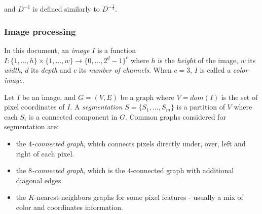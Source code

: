 and $D^{-1}$ is defined similarly to $D^{-\frac{1}{2}}$.

\subsubsection{Image processing}
In this document, an \emph{image} $I$ is a function $I : \{1, ..., h\} \times \{1, ..., w\} \rightarrow \{0, ..., 2^d - 1\}^c$ where $h$ is the \emph{height} of the image, $w$ its \emph{width}, $d$ its \emph{depth} and $c$ its \emph{number of channels}. When $c = 3$, $I$ is called a \emph{color image}.

Let $I$ be an image, and $G = (V,E)$ be a graph where $V = dom(I)$ is the set of pixel coordinates of $I$. A \emph{segmentation} $S = \{S_1, ..., S_m\}$ is a partition of $V$ where each $S_i$ is a connected component in $G$. Common graphs considered for segmentation are:

\begin{itemize}
\item the \emph{$4$-connected graph}, which connects pixels directly under, over, left and right of each pixel.
\item the \emph{$8$-connected graph}, which is the $4$-connected graph with additional diagonal edges.
\item the $K$-nearest-neighbors graphs for some pixel features - usually a mix of color and coordinates information.
\end{itemize}